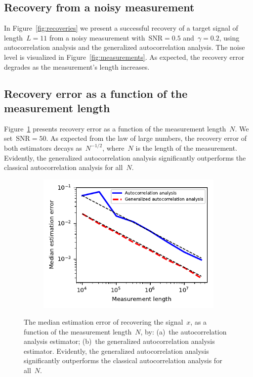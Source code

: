 \documentclass{article}
\begin{document}
\subsection{Recovery from a noisy measurement}
\label{subsec:exp_recovery}
In Figure~\ref{fig:recoveries} we present a successful recovery of a target signal of length~\mbox{$L = 11$} from a noisy measurement with~\mbox{$\text{SNR} = 0.5$} and~\mbox{$\gamma = 0.2$}, using autocorrelation analysis and the generalized autocorrelation analysis. The noise level is visualized in Figure~\ref{fig:measurements}. As expected, the recovery error degrades as the measurement's length increases.

\subsection{Recovery error as a function of the measurement length}
\label{subsec:exp_size}
Figure~\ref{fig:err_size_experiment} presents recovery error as a function of the measurement length~$N$. We set~\mbox{$\text{SNR} = 50$}. As expected from the law of large numbers, the recovery error of both estimators decays as~$N^{-1/2}$, where~$N$ is the length of the measurement. Evidently, the generalized autocorrelation analysis significantly outperforms the classical autocorrelation analysis for all~$N$.

\begin{figure}[!tb]
	\begin{subfigure}[ht]{\columnwidth}
		\centering
		\includegraphics[width=\columnwidth]{figures/experiment_size_err.pdf}
	\end{subfigure}
	\caption{The median estimation error of recovering the signal~$x$, as a function of the measurement length~$N$, by: (a)~the autocorrelation analysis estimator; (b)~the generalized autocorrelation analysis estimator. Evidently, the generalized autocorrelation analysis significantly outperforms the classical autocorrelation analysis for all~$N$.}
\label{fig:err_size_experiment}
\end{figure}
\end{document}

